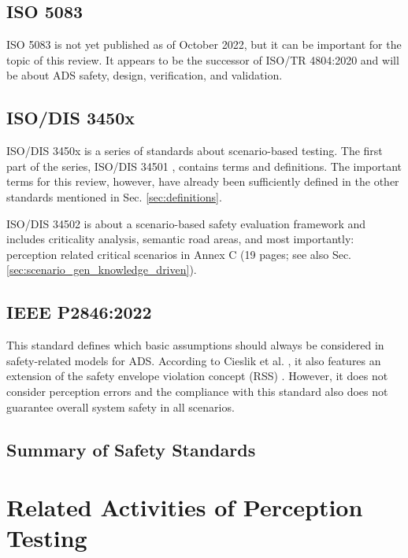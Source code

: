 \documentclass[conference]{IEEEtran}
\newcommand{\new}[1]{{\color{my-red}#1}}
\begin{document}
\new{\subsection{ISO 5083}}

ISO 5083 \cite{ISO_5083_safety_for_ADS} is not yet published as of October 2022, but it can be important for the topic of this review. 
It appears to be the successor of ISO/TR 4804:2020 and will be about ADS safety, design, verification, and validation.

\new{\subsection{ISO/DIS 3450x}}

ISO/DIS 3450x is a series of standards about scenario-based testing.
The first part of the series, ISO/DIS 34501 \cite{ISO_DIS_34501_2021}, contains terms and definitions. The important terms for this review, however, have already been sufficiently defined in the other standards mentioned in Sec. \ref{sec:definitions}.

ISO/DIS 34502 \cite{ISO_DIS_34502_2021} is about a scenario-based safety evaluation framework and includes criticality analysis, semantic road areas, and most importantly: perception related critical scenarios in Annex C (19 pages; see also Sec. \ref{sec:scenario_gen_knowledge_driven}).

\new{\subsection{IEEE P2846:2022}}

This standard defines which basic assumptions should always be considered in safety-related models for ADS. 
According to Cieslik et al. \cite{Cieslik2022argumentation}, it also features an extension of the safety envelope violation concept (RSS) \cite{IEEE2022_2846_standard}.
However, it does not consider perception errors and the compliance with this standard also does not guarantee overall system safety in all scenarios. 


\subsection{Summary of Safety Standards}



\section{\new{Related} Activities of Perception Testing}
\label{sec:established}
\end{document}
